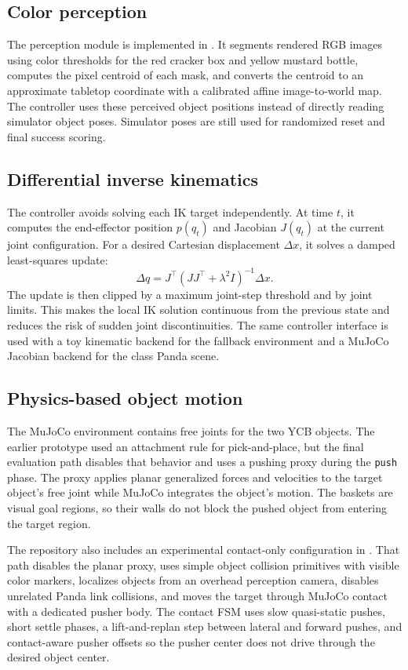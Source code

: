 \documentclass{article}
\begin{document}
\subsection{Color perception}

The perception module is implemented in . It segments rendered RGB images using color thresholds for the red cracker box and yellow mustard bottle, computes the pixel centroid of each mask, and converts the centroid to an approximate tabletop coordinate with a calibrated affine image-to-world map. The controller uses these perceived object positions instead of directly reading simulator object poses. Simulator poses are still used for randomized reset and final success scoring.

\subsection{Differential inverse kinematics}

The controller avoids solving each IK target independently. At time $t$, it computes the end-effector position $p(q_t)$ and Jacobian $J(q_t)$ at the current joint configuration. For a desired Cartesian displacement $\Delta x$, it solves a damped least-squares update:
\[
  \Delta q = J^\top (JJ^\top + \lambda^2 I)^{-1} \Delta x.
\]
The update is then clipped by a maximum joint-step threshold and by joint limits. This makes the local IK solution continuous from the previous state and reduces the risk of sudden joint discontinuities. The same controller interface is used with a toy kinematic backend for the fallback environment and a MuJoCo Jacobian backend for the class Panda scene.

\subsection{Physics-based object motion}

The MuJoCo environment contains free joints for the two YCB objects. The earlier prototype used an attachment rule for pick-and-place, but the final evaluation path disables that behavior and uses a pushing proxy during the \texttt{push} phase. The proxy applies planar generalized forces and velocities to the target object's free joint while MuJoCo integrates the object's motion. The baskets are visual goal regions, so their walls do not block the pushed object from entering the target region.

The repository also includes an experimental contact-only configuration in . That path disables the planar proxy, uses simple object collision primitives with visible color markers, localizes objects from an overhead perception camera, disables unrelated Panda link collisions, and moves the target through MuJoCo contact with a dedicated pusher body. The contact FSM uses slow quasi-static pushes, short settle phases, a lift-and-replan step between lateral and forward pushes, and contact-aware pusher offsets so the pusher center does not drive through the desired object center.
\end{document}
